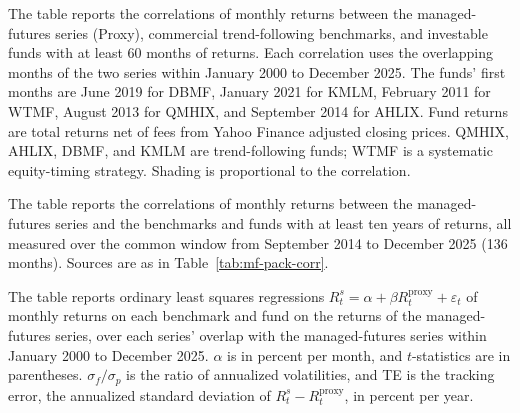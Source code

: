 \begin{table}[p]
\centering
\caption{Correlations of monthly returns: managed-futures series, benchmarks, and investable funds}
\label{tab:mf-pack-corr}
\begin{minipage}{\linewidth}\small The table reports the correlations of monthly returns between the
managed-futures series (Proxy), commercial trend-following benchmarks, and investable funds with at least
60 months of returns. Each correlation uses the overlapping months of the two series within January 2000
to December 2025. The funds' first months are June 2019 for DBMF, January 2021 for KMLM, February 2011 for
WTMF, August 2013 for QMHIX, and September 2014 for AHLIX. Fund returns are total returns net of fees from
Yahoo Finance adjusted closing prices. QMHIX, AHLIX, DBMF, and KMLM are trend-following funds; WTMF is a
systematic equity-timing strategy. Shading is proportional to the correlation.\end{minipage}
\medskip

\footnotesize

\end{table}

\begin{table}[p]
\centering
\caption{Correlations of monthly returns over a common window}
\label{tab:mf-pack-long-corr}
\begin{minipage}{\linewidth}\small The table reports the correlations of monthly returns between the
managed-futures series and the benchmarks and funds with at least ten years of returns, all measured over
the common window from September 2014 to December 2025 (136 months). Sources are as in
Table~\ref{tab:mf-pack-corr}.\end{minipage}
\medskip

\footnotesize

\end{table}

\begin{table}[p]
\centering
\caption{Regressions of benchmark and fund returns on the managed-futures series}
\label{tab:mf-pack-reg}
\begin{minipage}{\linewidth}\small The table reports ordinary least squares regressions
$R^{s}_t=\alpha+\beta R^{\text{proxy}}_t+\varepsilon_t$ of monthly returns on each benchmark and fund on
the returns of the managed-futures series, over each series' overlap with the managed-futures series
within January 2000 to December 2025. $\alpha$ is in percent per month, and $t$-statistics are in
parentheses. $\sigma_f/\sigma_p$ is the ratio of annualized volatilities, and TE is the tracking error, the
annualized standard deviation of $R^{s}_t-R^{\text{proxy}}_t$, in percent per year.\end{minipage}
\medskip

\footnotesize

\end{table}

